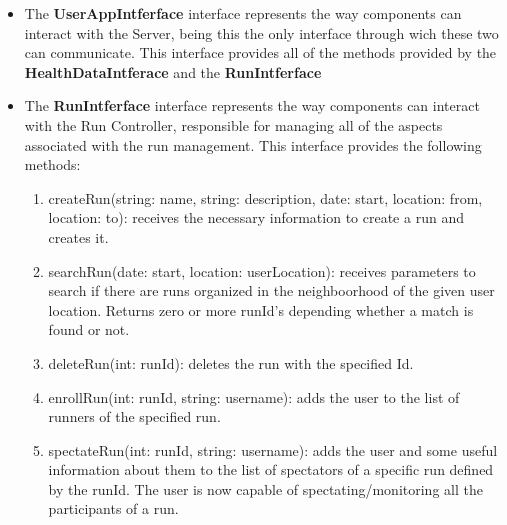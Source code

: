 \documentclass[12pt]{article}
\begin{document}
\begin{itemize}
    \item The \textbf{UserAppIntferface} interface represents the way components can interact with the Server, being this the only interface through wich these two can communicate. This interface provides all of the methods provided by the \textbf{HealthDataIntferace} and the \textbf{RunIntferface}
    \item The \textbf{RunIntferface} interface represents the way components can interact with the Run Controller, responsible for managing all of the aspects associated with the run management. This interface provides the following methods: 
    \begin{enumerate}
        \item createRun(string: name, string: description, date: start, location: from, location: to): receives the necessary information to create a run and creates it. 
        \item searchRun(date: start, location: userLocation): receives parameters to search if there are runs organized in the neighboorhood of the given user location. Returns zero or more runId's depending whether a match is found or not.
        \item deleteRun(int: runId): deletes the run with the specified Id. 
        \item enrollRun(int: runId, string: username): adds the user to the list of runners of the specified run.
        \item spectateRun(int: runId, string: username): adds the user and some useful information about them to the list of spectators of a specific run defined by the runId. The user is now capable of spectating/monitoring all the participants of a run.
    \end{enumerate}
    

\end{itemize}
\end{document}
